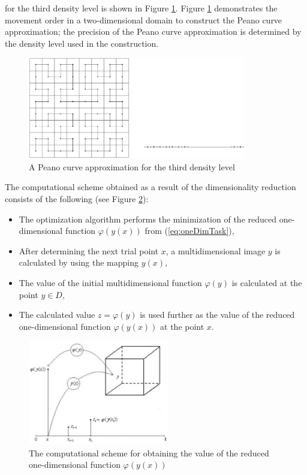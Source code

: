 \documentclass{aims}
\theoremstyle{definition}
\begin{document}
for the third density level is shown in Figure \ref{fig:peanoC}. Figure \ref{fig:peanoC}
demonstrates the movement order in a two-dimensional domain to construct the Peano
curve approximation; the precision of the Peano curve approximation is determined by the
density level used in the construction.
\begin{figure}
    \centering
    \includegraphics[width=0.85\textwidth]{pictures/peanoC.eps}
    \caption{A Peano curve approximation for the third density level}
    \label{fig:peanoC}
\end{figure}

\par
The computational scheme obtained as a result of the dimensionality reduction consists of the following
(see Figure \ref{fig:peanoCUsage}):
\begin{itemize}
  \item The optimization algorithm performs the minimization of the reduced one-dimensional
  function \(\varphi(y(x))\) from (\ref{eq:oneDimTask}),
  \item After determining the next trial point \(x\), a multidimensional image \(y\) is calculated by using the
mapping \(y(x)\),
  \item The value of the initial multidimensional function \(\varphi(y)\) is calculated at the point \(y\in D\),
  \item The calculated value \(z=\varphi(y)\) is used further as the value of the reduced one-dimensional function \(\varphi(y(x))\) at the point \(x\).
\end{itemize}

\begin{figure}
    \centering
    \includegraphics[width=0.55\textwidth]{pictures/peanoCUsage.eps}
    \caption{The computational scheme for obtaining the value of the reduced one-dimensional function \(\varphi(y(x))\)}
    \label{fig:peanoCUsage}
\end{figure}
\end{document}
